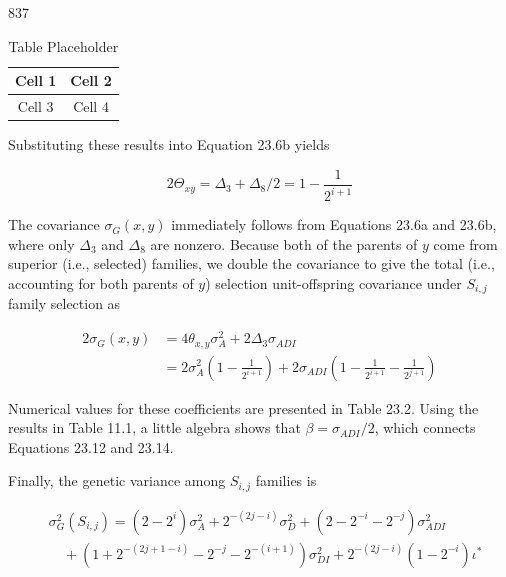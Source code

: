\documentclass{article}
\begin{document}
837

\begin{table}[h]
\centering
\begin{tabular}{|c|c|}
\hline
Cell 1 & Cell 2 \\
\hline
Cell 3 & Cell 4 \\
\hline
\end{tabular}
\caption{Table Placeholder}
\end{table}

Substituting these results into Equation 23.6b yields

\begin{equation}
2\Theta_{xy}=\Delta_{3}+\Delta_{8}/2=1-\frac{1}{2^{i+1}}
\tag{23.13c}
\label{eq:23_13c}
\end{equation}

The covariance  $ \sigma_G(x, y) $ immediately follows from Equations 23.6a and 23.6b, where only  $ \Delta_3 $ and  $ \Delta_8 $ are nonzero. Because both of the parents of  $ y $ come from superior (i.e., selected) families, we double the covariance to give the total (i.e., accounting for both parents of  $ y $) selection unit-offspring covariance under  $ S_{i,j} $ family selection as

\begin{equation}
\begin{aligned}2\sigma_{G}(x,y)&=4\theta_{x,y}\sigma_{A}^{2}+2\Delta_{3}\sigma_{ADI}\\&=2\sigma_{A}^{2}\left(1-\frac{1}{2^{i+1}}\right)+2\sigma_{ADI}\left(1-\frac{1}{2^{i+1}}-\frac{1}{2^{j+1}}\right)\end{aligned}
\tag{23.14}
\label{eq:23_14}
\end{equation}

Numerical values for these coefficients are presented in Table 23.2. Using the results in Table 11.1, a little algebra shows that  $ \beta = \sigma_{ADI}/2 $, which connects Equations 23.12 and 23.14.

Finally, the genetic variance among  $ S_{i,j} $ families is

\begin{equation}
\begin{aligned}&\sigma_{G}^{2}(S_{i,j})=(2-2^{i})\sigma_{A}^{2}+2^{-(2j-i)}\sigma_{D}^{2}+(2-2^{-i}-2^{-j})\sigma_{ADI}^{2}\\ &\quad+\left(1+2^{-(2j+1-i)}-2^{-j}-2^{-(i+1)}\right)\sigma_{DI}^{2}+2^{-(2j-i)}\left(1-2^{-i}\right)\iota^{*}\\ \end{aligned}
\tag{23.15}
\label{eq:23_15}
\end{equation}
\end{document}
